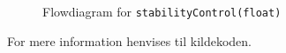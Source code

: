 \begin{figure}[H]
\centering
{}
\caption[Diagram]{Flowdiagram for \texttt{stabilityControl(float)}}
\label{fig:stabilityControl}
\end{figure}

For mere information henvises til kildekoden.
